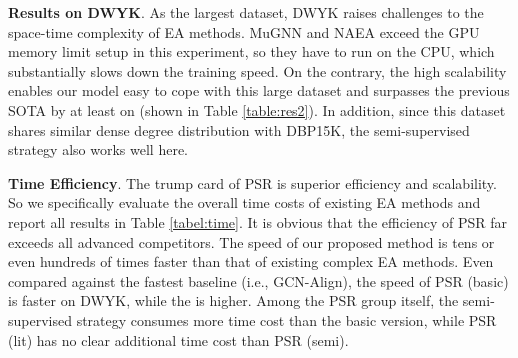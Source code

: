 \documentclass[sigconf]{acmart}
\begin{document}
\begin{table}[t]
\renewcommand\arraystretch{1}
\centering
{}
\caption{Ablation experiments of model architecture.}
\label{table:model_ablation}
\vspace{-2em}
\end{table}



\noindent
\textbf{Results on DWYK}.
As the largest dataset, DWYK raises challenges to the space-time complexity of EA methods.
MuGNN and NAEA exceed the GPU memory limit setup in this experiment, so they have to run on the CPU, which substantially slows down the training speed.
On the contrary, the high scalability enables our model easy to cope with this large dataset and surpasses the previous SOTA by at least  on  (shown in Table \ref{table:res2}).
In addition, since this dataset shares similar dense degree distribution with DBP15K, the semi-supervised strategy also works well here.



\noindent
\textbf{Time Efficiency}.
The trump card of PSR is superior efficiency and scalability.
So we specifically evaluate the overall time costs of existing EA methods and report all results in Table \ref{tabel:time}.
It is obvious that the efficiency of PSR far exceeds all advanced competitors.
The speed of our proposed method is tens or even hundreds of times faster than that of existing complex EA methods.
Even compared against the fastest baseline (i.e., GCN-Align), the speed of PSR (basic) is  faster on DWYK, while the  is  higher.
Among the PSR group itself, the semi-supervised strategy consumes  more time cost than the basic version, while PSR (lit) has no clear additional time cost than PSR (semi).
\end{document}
